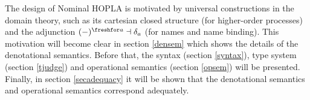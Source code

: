 \documentclass[twoside]{article}
\begin{document}
The design of Nominal HOPLA is motivated by universal constructions in the
domain theory, such as its cartesian closed structure (for higher-order
processes) and the adjunction $(-)^{\freshfor a} \dashv \delta_a$ (for names
and name binding). This motivation will become clear in section \ref{densem}
which shows the details of the denotational semantics. Before that, the syntax
(section \ref{syntax}), type system (section \ref{tjudge}) and operational
semantics (section \ref{opsem}) will be presented. Finally, in section
\ref{secadequacy} it will be shown that the denotational semantics and
operational semantics correspond adequately.











\vfill\pagebreak










\end{document}
